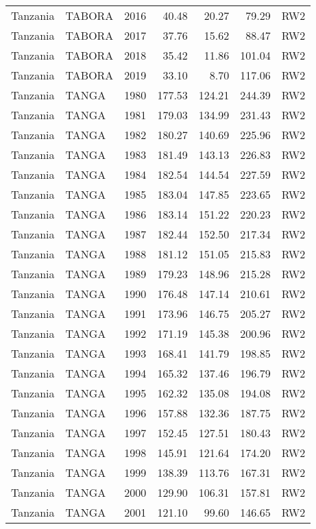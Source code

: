 \begin{longtable}{lllrrrl}
  Tanzania & TABORA & 2016 & 40.48 & 20.27 & 79.29 & RW2 \\ 
  Tanzania & TABORA & 2017 & 37.76 & 15.62 & 88.47 & RW2 \\ 
  Tanzania & TABORA & 2018 & 35.42 & 11.86 & 101.04 & RW2 \\ 
  Tanzania & TABORA & 2019 & 33.10 & 8.70 & 117.06 & RW2 \\ 
  Tanzania & TANGA & 1980 & 177.53 & 124.21 & 244.39 & RW2 \\ 
  Tanzania & TANGA & 1981 & 179.03 & 134.99 & 231.43 & RW2 \\ 
  Tanzania & TANGA & 1982 & 180.27 & 140.69 & 225.96 & RW2 \\ 
  Tanzania & TANGA & 1983 & 181.49 & 143.13 & 226.83 & RW2 \\ 
  Tanzania & TANGA & 1984 & 182.54 & 144.54 & 227.59 & RW2 \\ 
  Tanzania & TANGA & 1985 & 183.04 & 147.85 & 223.65 & RW2 \\ 
  Tanzania & TANGA & 1986 & 183.14 & 151.22 & 220.23 & RW2 \\ 
  Tanzania & TANGA & 1987 & 182.44 & 152.50 & 217.34 & RW2 \\ 
  Tanzania & TANGA & 1988 & 181.12 & 151.05 & 215.83 & RW2 \\ 
  Tanzania & TANGA & 1989 & 179.23 & 148.96 & 215.28 & RW2 \\ 
  Tanzania & TANGA & 1990 & 176.48 & 147.14 & 210.61 & RW2 \\ 
  Tanzania & TANGA & 1991 & 173.96 & 146.75 & 205.27 & RW2 \\ 
  Tanzania & TANGA & 1992 & 171.19 & 145.38 & 200.96 & RW2 \\ 
  Tanzania & TANGA & 1993 & 168.41 & 141.79 & 198.85 & RW2 \\ 
  Tanzania & TANGA & 1994 & 165.32 & 137.46 & 196.79 & RW2 \\ 
  Tanzania & TANGA & 1995 & 162.32 & 135.08 & 194.08 & RW2 \\ 
  Tanzania & TANGA & 1996 & 157.88 & 132.36 & 187.75 & RW2 \\ 
  Tanzania & TANGA & 1997 & 152.45 & 127.51 & 180.43 & RW2 \\ 
  Tanzania & TANGA & 1998 & 145.91 & 121.64 & 174.20 & RW2 \\ 
  Tanzania & TANGA & 1999 & 138.39 & 113.76 & 167.31 & RW2 \\ 
  Tanzania & TANGA & 2000 & 129.90 & 106.31 & 157.81 & RW2 \\ 
  Tanzania & TANGA & 2001 & 121.10 & 99.60 & 146.65 & RW2 \\ 

\end{longtable}
